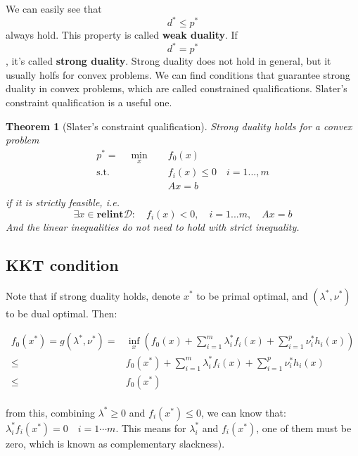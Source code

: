 \documentclass[
]{book}
\newtheorem{theorem}{Theorem}[chapter]
\theoremstyle{definition}
\theoremstyle{definition}
\theoremstyle{definition}
\theoremstyle{definition}
\theoremstyle{remark}
\begin{document}
We can easily see that \[d^*\leq p^*\] always hold. This property is called \textbf{weak duality}. If \[d^*=p^*\], it's called \textbf{strong duality}. Strong duality does not hold in general, but it usually holfs for convex problems. We can find conditions that guarantee strong duality in convex problems, which are called constrained qualifications. Slater's constraint qualification is a useful one.

\begin{theorem}[Slater's constraint qualification]
\protect\hypertarget{thm:slater}{}\label{thm:slater}Strong duality holds for a convex problem
\begin{equation}
  \begin{aligned}
  p^* = \quad \min_{x} \quad & f_0(x)\\
  \textrm{s.t.} \quad & f_i(x)\leq 0\quad i=1...,m\\
    & Ax=b   \\
  \end{aligned}
 \end{equation}
if it is strictly feasible, i.e.
\[\exists x\in\textbf{relint}\mathcal{D}:\quad f_i(x)<0,\quad i=1...m,\quad Ax=b\]
And the linear inequalities do not need to hold with strict inequality.
\end{theorem}

\subsection{KKT condition}\label{appconvex-theory-kkt}

Note that if strong duality holds, denote \(x^*\) to be primal optimal, and \((\lambda^*,\nu^*)\) to be dual optimal. Then:

\begin{equation}
  \begin{aligned}
  f_0(x^*) = g(\lambda^*,\nu^*) = & \inf_x(f_0(x)+\sum_{i=1}^m\lambda_i^*f_i(x)+\sum_{i=1}^p\nu_i^*h_i(x))\\
 \leq & f_0(x^*)+\sum_{i=1}^m\lambda_i^*f_i(x)+\sum_{i=1}^p\nu_i^*h_i(x)\\
 \leq & f_0(x^*)\\
  \end{aligned}
  \end{equation}

from this, combining \(\lambda^*\geq 0\) and \(f_i(x^*)\leq 0\), we can know that: \(\lambda_i^*f_i(x^*)=0\quad i=1\cdots m\). This means for \(\lambda_i^*\) and \(f_i(x^*)\), one of them must be zero, which is known as complementary slackness).
\end{document}
